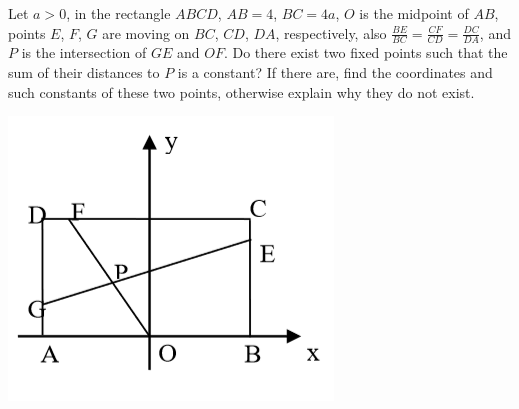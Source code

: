 \documentclass[letterpaper,10pt,addpoints]{exam}
\begin{document}
\begin{questions}
\question[14]
Let $a>0$, in the rectangle $ABCD$, $AB=4$, $BC=4a$, $O$ is the midpoint of $AB$, points $E$, $F$, $G$ are moving on $BC$, $CD$, $DA$, respectively, also $\frac{BE}{BC}=\frac{CF}{CD}=\frac{DC}{DA}$, and $P$ is the intersection of $GE$ and $OF$. Do there exist two fixed points such that the sum of their distances to $P$ is a constant? If there are, find the coordinates and such constants of these two points, otherwise explain why they do not exist.
\begin{center}
    \includegraphics[scale=0.6]{q21.PNG}
\end{center}
\clearpage


\end{questions}
\end{document}

